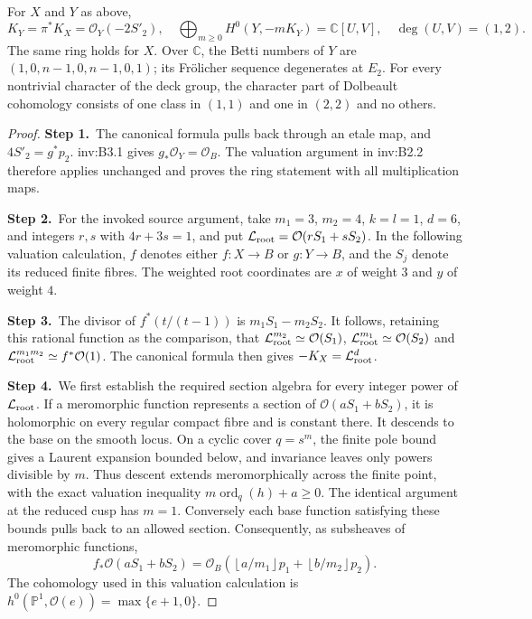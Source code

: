 \begin{theorem}\label{inv:B3.3}
For $X$ and $Y$ as above,
\[
K_Y=\pi^*K_X=\mathcal O_Y(-2S'_2),\quad
\bigoplus_{m\ge0}H^0(Y,-mK_Y)=\mathbb C[U,V],\quad
\deg(U,V)=(1,2).
\]
The same ring holds for $X$.
Over $\mathbb C$, the Betti numbers of $Y$ are
$(1,0,n-1,0,n-1,0,1)$; its Fr\"olicher sequence degenerates at $E_2$.
For every nontrivial character of the deck group, the character
part of Dolbeault cohomology consists of one class in $(1,1)$ and
one in $(2,2)$ and no others.
\end{theorem}

\begin{proof}
\par\smallskip\noindent\textbf{Step 1.}\ The canonical formula pulls back through an etale map, and
$4S'_2=g^*p_2$. inv:B3.1 gives $g_*\mathcal O_Y=\mathcal O_B$.
The valuation argument in inv:B2.2 therefore applies unchanged and proves
the ring statement with all multiplication maps.

\par\smallskip\noindent\textbf{Step 2.}\ For the invoked source argument, take $m_1=3$, $m_2=4$, $k=l=1$, $d=6$, and integers $r,s$ with $4r+3s=1$, and put $\mathcal L_{\rm root}=\mathcal O(rS_1+sS_2)$. In the following valuation calculation, $f$ denotes either $f:X\to B$ or $g:Y\to B$, and the $S_j$ denote its reduced finite fibres. The weighted root coordinates are $x$ of weight $3$ and $y$ of weight $4$.

\par\smallskip\noindent\textbf{Step 3.}\ The divisor of $f^*(t/(t-1))$ is $m_1S_1-m_2S_2$.
It follows, retaining this rational function as the comparison, that
$\mathcal L_{\rm root}^{m_2}\simeq\mathcal O(S_1)$,
$\mathcal L_{\rm root}^{m_1}\simeq\mathcal O(S_2)$ and
$\mathcal L_{\rm root}^{m_1m_2}\simeq f^*\mathcal O(1)$.
The canonical formula then gives $-K_X=\mathcal L_{\rm root}^d$.

\par\smallskip\noindent\textbf{Step 4.}\ We first establish the required section algebra for every integer
power of $\mathcal L_{\rm root}$. If a meromorphic function represents a section
of $\mathcal O(aS_1+bS_2)$, it is holomorphic on every regular compact fibre
and is constant there. It descends to the base on the smooth locus.
On a cyclic cover $q=s^m$, the finite pole bound gives a Laurent
expansion bounded below, and invariance leaves only powers divisible
by $m$. Thus descent extends meromorphically across the finite point,
with the exact valuation inequality $m\operatorname{ord}_q(h)+a\ge0$.
The identical argument at the reduced cusp has $m=1$.
Conversely each base function satisfying these bounds pulls back to
an allowed section. Consequently, as subsheaves of meromorphic functions,
\[
f_*\mathcal O(aS_1+bS_2)=
\mathcal O_B\left(\left\lfloor a/m_1\right\rfloor p_1+
\left\lfloor b/m_2\right\rfloor p_2\right).
\]
The cohomology used in this valuation calculation is $h^0(\mathbb P^1,\mathcal O(e))=\max\{e+1,0\}$.


\end{proof}
